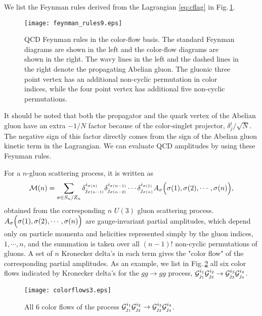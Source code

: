 \documentclass[a4paper,11pt]{article}
\begin{document}
We list the Feynman rules derived from the Lagrangian  \eqref{eq:cflag} in
Fig.\,\ref{fig:diagrams}. 
\begin{figure}
\begin{center}
\texttt{[image: feynman\_rules9.eps]}
\caption{QCD Feynman rules in the color-flow basis. The standard
Feynman diagrams are shown in the left and the color-flow diagrams are
 shown in the right. The wavy lines in the left and the dashed lines in the right denote the propagating Abelian gluon. The
 gluonic three point vertex has an additional non-cyclic
 permutation in color indices, while the four point vertex has additional five non-cyclic permutations.}
\label{fig:diagrams}
\end{center}
\end{figure}
It should be noted that both the propagator and the quark vertex of the Abelian gluon have an extra
$-1/N$ factor because of the color-singlet projector, $\delta^i_j/\sqrt{N}$. The negative sign of this factor directly comes from the sign
of the Abelian gluon kinetic term in the Lagrangian. We can evaluate QCD amplitudes by using these Feynman rules.
 
 For a $n$-gluon scattering process, it is written as
\begin{equation}
 {\cal M}(n)=\sum_{\sigma\in S_n/Z_n}\delta^{i_{\sigma(n)}}_{j_{\sigma(n-1)}}
\delta^{i_{\sigma(n-1)}}_{j_{\sigma(n-2)}}\cdots\delta^{i_{\sigma(1)}}_{j_{\sigma(n)}}
A_{\sigma}\Bigl(\sigma(1),\sigma(2),\cdots,\sigma(n)\Bigr),
\label{eq:Mn}
\end{equation}
obtained from the corresponding $n$ $U(3)$ gluon scattering process. $A_{\sigma}\Bigl(\sigma(1),\sigma(2),\cdots,\sigma(n)\Bigr)$ are
gauge-invariant partial
amplitudes, which depend only on particle momenta and
helicities represented simply by the gluon indices, $1,\cdots,n$, and
 the summation is taken over all $(n-1)!$ non-cyclic permutations of
gluons. A set of $n$ Kronecker delta's in each term gives the "color flow"
of the corresponding partial amplitudes. As an example, we list in Fig.\,\ref{fig:colorflows} all six color flows indicated by Kronecker delta's
for the  $gg\rightarrow gg$ process, ${\cal
G}_{j_1}^{i_1}{\cal G}_{j_2}^{i_2}\rightarrow{\cal G}_{j_3}^{i_3}{\cal
G}_{j_4}^{i_4}$.
\begin{figure}
\begin{center}
\texttt{[image: colorflows3.eps]}
\caption{All 6 color flows of the process ${\cal
G}_{j_1}^{i_1}{\cal G}_{j_2}^{i_2}\rightarrow{\cal G}_{j_3}^{i_3}{\cal
G}_{j_4}^{i_4}$.}
\label{fig:colorflows}
\end{center}
\end{figure}
\end{document}

